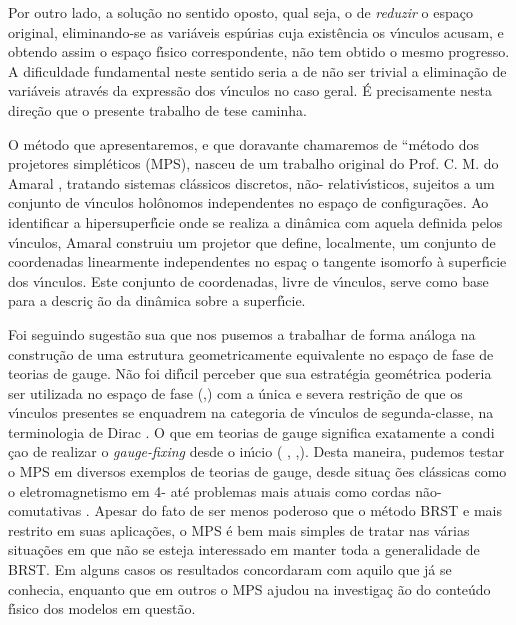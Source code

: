 \documentclass[a4paper,thmsa,12pt]{report}
\begin{document}
Por outro lado, a solu\c{c}\~{a}o no sentido oposto, qual seja, o de \textit{%
reduzir }o espa\c{c}o original, eliminando-se as vari\'{a}veis esp\'{u}rias
cuja exist\^{e}ncia os v\'{\i}nculos acusam, e obtendo assim o espa\c{c}o
f\'{\i}sico correspondente, n\~{a}o tem obtido o mesmo progresso. A
dificuldade fundamental neste sentido seria a de n\~{a}o ser trivial a
elimina\c{c}\~{a}o de vari\'{a}veis atrav\'{e}s da express\~{a}o dos
v\'{\i}nculos no caso geral. \'{E} precisamente nesta dire\c{c}\~{a}o que o
presente trabalho de tese caminha.

O m\'{e}todo que apresentaremos, e que doravante chamaremos de ``m\'{e}todo
dos projetores simpl\'{e}ticos (MPS), nasceu de um trabalho original do
Prof. C. M. do Amaral \cite{cma}, tratando sistemas cl\'{a}ssicos discretos,
n\~{a}o- relativ\'{\i}sticos, sujeitos a um conjunto de v\'{\i}nculos
hol\^{o}nomos independentes no espa\c{c}o de configura\c{c}\~{o}es. Ao
identificar a hipersuperf\'{\i}cie onde se realiza a din\^{a}mica com aquela
definida pelos v\'{\i}nculos, Amaral construiu um projetor que define,
localmente, um conjunto de coordenadas linearmente independentes no espa\c{c}%
o tangente isomorfo \`{a} superf\'{\i}cie dos v\'{\i}nculos. Este conjunto
de coordenadas, livre de v\'{\i}nculos, serve como base para a descri\c{c}%
\~{a}o da din\^{a}mica sobre a superf\'{\i}cie.

Foi seguindo sugest\~{a}o sua que nos pusemos a trabalhar de forma
an\'{a}loga na constru\c{c}\~{a}o de uma estrutura geometricamente
equivalente no espa\c{c}o de fase de teorias de gauge. N\~{a}o foi
dif\'{\i}cil perceber que sua estrat\'{e}gia geom\'{e}trica poderia ser
utilizada no espa\c{c}o de fase (\cite{cma e pitanga},\cite{pitanga}) com a
\'{u}nica e severa restri\c{c}\~{a}o de que os v\'{\i}nculos presentes se
enquadrem na categoria de v\'{\i}nculos de segunda-classe, na terminologia
de Dirac \cite{dirac}. O que em teorias de gauge significa exatamente a condi%
\c{c}ao de realizar o \textit{gauge-fixing }desde o in\'{\i}cio (\cite
{sudarsham} ,\cite{sundermeyer} ,\cite{teitelboim}). Desta maneira, pudemos
testar o MPS em diversos exemplos de teorias de gauge, desde situa\c{c}%
\~{o}es cl\'{a}ssicas como o eletromagnetismo em 4-\coordHE{} \cite{qed} at\'{e}
problemas mais atuais como cordas n\~{a}o-comutativas \cite{mmi}. Apesar do
fato de ser menos poderoso que o m\'{e}todo BRST e mais restrito em suas
aplica\c{c}\~{o}es, o MPS \'{e} bem mais simples de tratar nas v\'{a}rias
situa\c{c}\~{o}es em que n\~{a}o se esteja interessado em manter toda a
generalidade de BRST. Em alguns casos os resultados concordaram com aquilo
que j\'{a} se conhecia, enquanto que em outros o MPS ajudou na investiga\c{c}%
\~{a}o do conte\'{u}do f\'{\i}sico dos modelos em quest\~{a}o.
\end{document}
